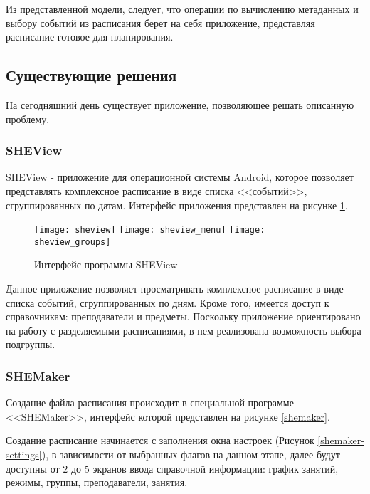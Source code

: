 
Из представленной модели, следует, что операции по вычислению метаданных и выбору событий из расписания берет на себя приложение, представляя расписание готовое для планирования.

\subsection{Существующие решения}

На сегодняшний день существует приложение, позволяющее решать описанную проблему.

\subsubsection{SHEView}

SHEView - приложение для операционной системы Android, которое позволяет представлять комплексное расписание в виде списка <<событий>>, сгруппированных по датам.
Интерфейс приложения представлен на рисунке \ref{sheview}.

\begin{figure}[!htb]
      \texttt{[image: sheview]}
  \endminipage\hfill
      \texttt{[image: sheview\_menu]}
  \endminipage\hfill
      \texttt{[image: sheview\_groups]}
  \endminipage
  \caption{Интерфейс программы SHEView} \label{sheview}
\end{figure}

Данное приложение позволяет просматривать комплексное расписание в виде списка событий, сгруппированных по дням.
Кроме того, имеется доступ к справочникам: преподаватели и предметы.
Поскольку приложение ориентировано на работу с разделяемыми расписаниями, в нем реализована возможность выбора подгруппы.

\subsubsection{SHEMaker}

Создание файла расписания происходит в специальной программе - <<SHEMaker>>, интерфейс которой представлен на рисунке \ref{shemaker}.


Создание расписание начинается с заполнения окна настроек (Рисунок \ref{shemaker-settings}), в зависимости от выбранных флагов на данном этапе, далее будут доступны от 2 до 5 экранов ввода справочной информации: график занятий, режимы, группы, преподаватели, занятия.

